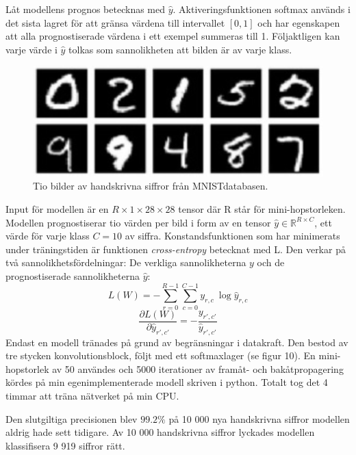 \documentclass[a4paper,11pt,twoside]{article}
\newcommand*{\pd}[2]{\ensuremath{\dfrac{\partial #1}{\partial #2}}}
\begin{document}
Låt modellens prognos betecknas med $\hat{y}$. Aktiveringsfunktionen softmax används i det sista lagret för att gränsa värdena till intervallet $[0,1]$ och har egenskapen att alla prognostiserade värdena i ett exempel summeras till 1. Följaktligen kan varje värde i $\hat{y}$ tolkas som sannolikheten att bilden är av varje klass. \cite{cs231n}

\begin{figure}[h]\label{figMNIST}
	\centering
  		\includegraphics[scale=1]{mnist.png}
  	\caption{Tio bilder av handskrivna siffror från MNISTdatabasen. \cite{MNIST}}
\end{figure}

Input för modellen är en $R \times 1 \times 28 \times 28$ tensor där R står för mini-hopstorleken. Modellen prognostiserar tio värden per bild i form av en tensor $\hat{y} \in \mathbb{R}^{R \times C}$, ett värde för varje klass $C=10$ av siffra. Konstandsfunktionen som har minimerats under träningstiden är funktionen \textit{cross-entropy} betecknat med L. Den verkar på två sannolikhetsfördelningar: De verkliga sannolikheterna $y$ och de prognostiserade sannolikheterna $\hat{y}$: \cite{cs231n} \cite{notesonbackprop}
\begin{equation}
L(W) = - \sum^{R-1}_{r=0} \sum^{C-1}_{c=0}y_{r,c} \ \log{\hat{y}_{r,c}}
\end{equation}
\begin{equation}
\pd{L(W)}{\hat{y}_{r',c'}} = - \frac{y_{r',c'}}{\hat{y}_{r',c'}}
\end{equation}
Endast en modell tränades på grund av begränsningar i datakraft. Den bestod av tre stycken konvolutionsblock, följt med ett softmaxlager (se figur 10). En mini-hopstorlek av 50 användes och 5000 iterationer av framåt- och bakåtpropagering kördes på min egenimplementerade modell skriven i python. Totalt tog det 4 timmar att träna nätverket på min CPU. 

Den slutgiltiga precisionen blev $99.2\%$ på 10 000 nya handskrivna siffror modellen aldrig hade sett tidigare. Av 10 000 handskrivna siffror lyckades modellen klassifisera 9 919 siffror rätt.
\end{document}
